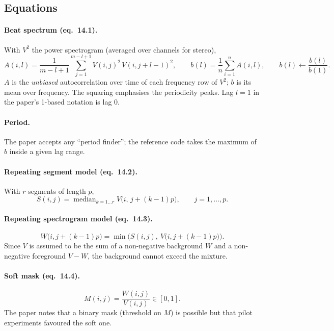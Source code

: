 \documentclass[11pt,a4paper]{article}
\DeclareMathOperator*{\median}{median}
\begin{document}
\subsection{Equations}
\paragraph{Beat spectrum (eq.~14.1).} With $V^2$ the power spectrogram
(averaged over channels for stereo),
\begin{equation}
  A(i,l) = \frac{1}{m-l+1}\sum_{j=1}^{m-l+1} V(i,j)^2\,V(i,j+l-1)^2,
  \qquad
  b(l) = \frac1n\sum_{i=1}^{n} A(i,l),\qquad b(l)\leftarrow \frac{b(l)}{b(1)} .
\end{equation}
$A$ is the \emph{unbiased} autocorrelation over time of each frequency row
of $V^2$; $b$ is its mean over frequency. The squaring emphasises the
periodicity peaks. Lag $l=1$ in the paper's 1-based notation is lag 0.

\paragraph{Period.} The paper accepts any ``period finder''; the
reference code takes the maximum of $b$ inside a given lag range.

\paragraph{Repeating segment model (eq.~14.2).} With $r$ segments of
length $p$,
\begin{equation}
  S(i,j) = \median_{k=1\dots r} V\big(i,\, j+(k-1)p\big),\qquad j=1,\dots,p .
\end{equation}

\paragraph{Repeating spectrogram model (eq.~14.3).}
\begin{equation}
  W\big(i,j+(k-1)p\big) = \min\Big(S(i,j),\ V\big(i,j+(k-1)p\big)\Big).
\end{equation}
Since $V$ is assumed to be the sum of a non-negative background $W$ and a
non-negative foreground $V-W$, the background cannot exceed the mixture.

\paragraph{Soft mask (eq.~14.4).}
\begin{equation}
  M(i,j)=\frac{W(i,j)}{V(i,j)}\in[0,1].
  \label{eq:softmask}
\end{equation}
The paper notes that a binary mask (threshold on $M$) is possible but that
pilot experiments favoured the soft one.
\end{document}
